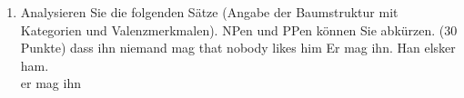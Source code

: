 \documentclass[fleqn,10pt,a4paper]{article}
\begin{document}
\begin{enumerate}

\bigskip





\item Analysieren Sie die folgenden Sätze (Angabe der Baumstruktur mit Kategorien und
  Valenzmerkmalen). NPen und PPen können Sie abkürzen. (30 Punkte)
\eal
\ex dass ihn niemand mag
\ex that nobody likes him
\ex Er mag ihn.
\ex 
\gll Han elsker ham.\\
     er  mag    ihn\\
\zl
\end{enumerate}




\end{document}
